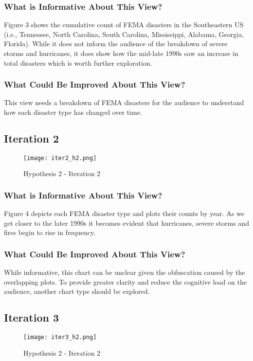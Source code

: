 \documentclass[11pt, letter]{article}
\begin{document}
\subsubsection*{What is Informative About This View?}
 Figure 3 shows the cumulative count of FEMA disasters in the Southeastern US (i.e., Tennessee, North Carolina, South Carolina, Mississippi, Alabama, Georgia, Florida). While it does not inform the audience of the breakdown of severe storms and hurricanes, it does show how the mid-late 1990s saw an increase in total disasters which is worth further exploration. 
 \subsubsection*{What Could Be Improved About This View?}
This view needs a breakdown of FEMA disasters for the audience to understand how each disaster type has changed over time. 
 \subsection*{Iteration 2}
\begin{figure}[h]
    \centering
    \texttt{[image: iter2\_h2.png]}
    \caption{Hypothesis 2 - Iteration 2}
    \label{fig:my_label}
\end{figure}
\subsubsection*{What is Informative About This View?}
 Figure 4 depicts each FEMA disaster type and plots their counts by year. As we get closer to the later 1990s it becomes evident that hurricanes, severe storms and fires begin to rise in frequency. 
 \subsubsection*{What Could Be Improved About This View?}
 While informative, this chart can be unclear given the obfuscation caused by the overlapping plots. To provide greater clarity and reduce the cognitive load on the audience, another chart type should be explored.  
 
 \subsection*{Iteration 3}
 \begin{figure}[h]
    \centering
    \texttt{[image: iter3\_h2.png]}
    \caption{Hypothesis 2 - Iteration 2}
    \label{fig:my_label}
\end{figure}
\end{document}

